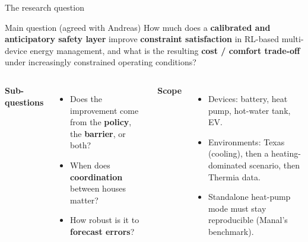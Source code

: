 \documentclass[aspectratio=169,10pt]{beamer}
\begin{document}
\begin{frame}{The research question}
\begin{block}{Main question (agreed with Andreas)}
\large How much does a \textbf{calibrated and anticipatory safety layer} improve \textbf{constraint satisfaction} in RL-based multi-device energy management, and what is the resulting \textbf{cost / comfort trade-off} under increasingly constrained operating conditions?
\end{block}
\vspace{0.5em}
\begin{columns}[T]
\textbf{Sub-questions}
\begin{itemize}
  \item Does the improvement come from the \textbf{policy}, the \textbf{barrier}, or both?
  \item When does \textbf{coordination} between houses matter?
  \item How robust is it to \textbf{forecast errors}?
\end{itemize}
\textbf{Scope}
\begin{itemize}
  \item Devices: battery, heat pump, hot-water tank, EV.
  \item Environments: Texas (cooling), then a heating-dominated scenario, then Thermia data.
  \item Standalone heat-pump mode must stay reproducible (Manal's benchmark).
\end{itemize}
\end{columns}
\end{frame}
\end{document}
